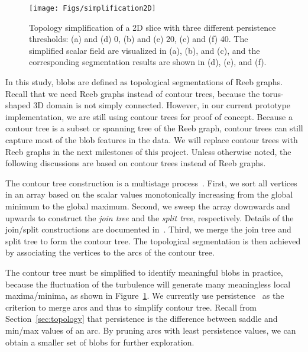 
\begin{figure}
  \centering
  \texttt{[image: Figs/simplification2D]}
  \caption{Topology simplification of a 2D slice with three different persistence thresholds: (a) and (d) 0, (b) and (e) 20, (c) and (f) 40.  The simplified scalar field are visualized in (a), (b), and (c), and the corresponding segmentation results are shown in (d), (e), and (f).}
  \label{fig:simplification2D}
\end{figure}


In this study, blobs are defined as topological segmentations of Reeb graphs.  Recall that we need Reeb graphs instead of contour trees, because the torus-shaped 3D domain is not simply connected.  However, in our current prototype implementation, we are still using contour trees for proof of concept.  Because a contour tree is a subset or spanning tree of the Reeb graph, contour trees can still capture most of the blob features in the data.  We will replace contour trees with Reeb graphs in the next milestones of this project.  Unless otherwise noted, the following discussions are based on contour trees instead of Reeb graphs.  



The contour tree construction is a multistage process~\cite{CarrSA00}.  First, we sort all vertices in an array based on the scalar values monotonically increasing from the global minimum to the global maximum.  Second, we sweep the array downwards and upwards to construct the \emph{join tree} and the \emph{split tree}, respectively.  Details of the join/split constructions are documented in~\cite{CarrSA00}.  Third, we merge the join tree and split tree to form the contour tree.  The topological segmentation is then achieved by associating the vertices to the arcs of the contour tree.  

The contour tree must be simplified to identify meaningful blobs in practice, because the fluctuation of the turbulence will generate many meaningless local maxima/minima, as shown in Figure~\ref{fig:simplification2D}.  We currently use persistence~\cite{EdelsbrunnerLZ02} as the criterion to merge arcs and thus to simplify contour tree.  Recall from Section~\ref{sec:topology} that persistence is the difference between saddle and min/max values of an arc.  By pruning arcs with least persistence values, we can obtain a smaller set of blobs for further exploration.  

